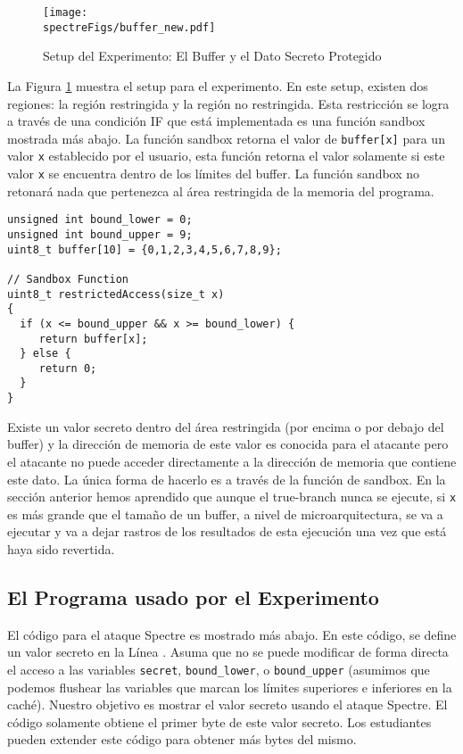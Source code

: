 \begin{figure}[htb]
\centering
\texttt{[image: \\spectreFigs/buffer\_new.pdf]}
\caption{Setup del Experimento: El Buffer y el Dato Secreto Protegido}
\label{spectre:fig:buffer}
\end{figure}

La Figura \ref{spectre:fig:buffer} muestra el setup para el experimento.
En este setup, existen dos regiones: la región restringida y la región no restringida.
Esta restricción se logra a través de una condición IF que está implementada es una función sandbox mostrada más abajo. La función sandbox retorna el valor de \texttt{buffer[x]} para un valor \texttt{x} establecido por el usuario, esta función retorna el valor solamente si este valor \texttt{x} se encuentra dentro de los límites del buffer.
La función sandbox no retonará nada que pertenezca al área restringida de la memoria del programa.

\begin{lstlisting}
unsigned int bound_lower = 0;
unsigned int bound_upper = 9;
uint8_t buffer[10] = {0,1,2,3,4,5,6,7,8,9};

// Sandbox Function
uint8_t restrictedAccess(size_t x)
{
  if (x <= bound_upper && x >= bound_lower) {
     return buffer[x];
  } else {
     return 0;
  }
}
\end{lstlisting}

Existe un valor secreto dentro del área restringida (por encima o por debajo del buffer) y la dirección de memoria de este valor es conocida para el atacante pero el atacante no puede acceder directamente a la dirección de memoria que contiene este dato.
La única forma de hacerlo es a través de la función de sandbox. En la sección anterior hemos aprendido que aunque el true-branch nunca se ejecute, si \texttt{x} es más grande que el tamaño de un buffer, a nivel de microarquitectura, se va a ejecutar y va a dejar rastros de los resultados de esta ejecución una vez que está haya sido revertida.


\subsection{El Programa usado por el Experimento}

El código para el ataque Spectre es mostrado más abajo. En este código, se define un valor secreto en la Línea . Asuma que no se puede modificar de forma directa el acceso a las variables \texttt{secret}, \texttt{bound\_lower}, o 
\texttt{bound\_upper} (asumimos que podemos flushear las variables que marcan los límites superiores e inferiores en la caché).
Nuestro objetivo es mostrar el valor secreto usando el ataque Spectre. El código solamente obtiene el primer byte de este valor secreto.
Los estudiantes pueden extender este código para obtener más bytes del mismo.


